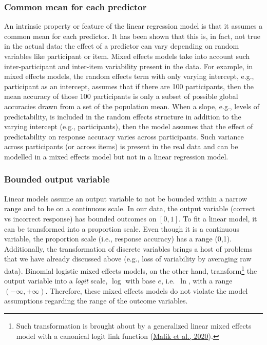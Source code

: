 \documentclass[a4paper, nobind]{templates/ociamthesis}
\begin{document}
\hypertarget{common-mean-for-each-predictor}{%
\subsubsection{Common mean for each predictor}\label{common-mean-for-each-predictor}}

An intrinsic property or feature of the linear regression model is that it assumes a common mean for each predictor.
It has been shown that this is, in fact, not true in the actual data:
the effect of a predictor can vary depending on random variables like participant or item.
Mixed effects models take into account such inter-participant and inter-item variability present in the data.
For example, in mixed effects models,
the random effects term with only varying intercept, e.g., participant as an intercept, assumes that if there are 100 participants, then the mean accuracy of those 100 participants is only a subset of possible global accuracies drawn from a set of the population mean.
When a slope, e.g., levels of predictability, is included in the random effects structure in addition to the varying intercept (e.g., participants), then the model assumes that the effect of predictability on response accuracy varies across participants.
Such variance across participants (or across items) is present in the real data
and can be modelled in a mixed effects model but not in a linear regression model.

\hypertarget{bounded-output-variable}{%
\subsubsection{Bounded output variable}\label{bounded-output-variable}}

Linear models assume an output variable to not be bounded within a narrow range and to be on a continuous scale.
In our data, the output variable (correct vs incorrect response) has bounded outcomes on \([0,1]\).
To fit a linear model, it can be transformed into a proportion scale.
Even though it is a continuous variable, the proportion scale (i.e., response accuracy) has a range (0,1).
Additionally, the transformation of discrete variables brings a host of problems that we have already discussed above (e.g., loss of variability by averaging raw data).
Binomial logistic mixed effects models, on the other hand, transform\footnote{Such transformation is brought about by a generalized linear mixed effects model with a canonical logit link function (\protect\hyperlink{ref-Malik2020}{Malik et al., 2020}).} the output variable into a \emph{logit} scale, \(\log\) with base \(e\), i.e.~\(\ln\), with a range \((-\infty, +\infty)\).
Therefore, these mixed effects models do not violate the model assumptions regarding the range of the outcome variables.
\end{document}
